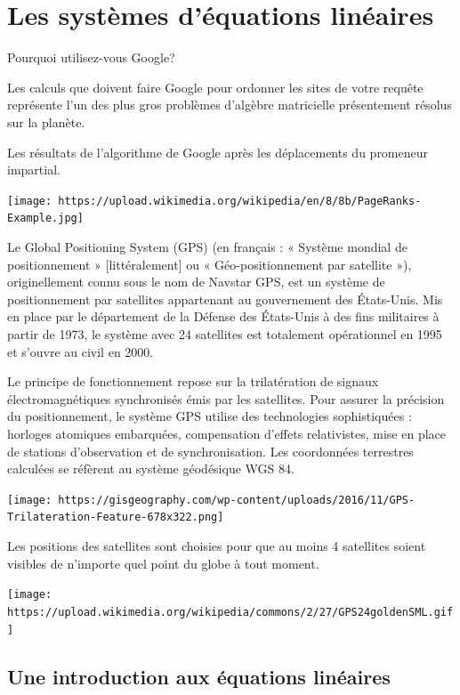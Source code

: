 \documentclass[]{book}
\theoremstyle{definition}
\theoremstyle{definition}
\theoremstyle{definition}
\theoremstyle{remark}
\let\BeginKnitrBlock\begin \let\EndKnitrBlock\end
\begin{document}
\hypertarget{sel}{%
\chapter{Les systèmes d'équations linéaires}\label{sel}}

\BeginKnitrBlock{example}
\protect\hypertarget{exm:unnamed-chunk-1}{}{\label{exm:unnamed-chunk-1} }Pourquoi utilisez-vous Google?

Les calculs que doivent faire Google pour ordonner les sites de votre requête représente l'un des plus gros problèmes d'algèbre matricielle présentement résolus sur la planète.

Les résultats de l'algorithme de Google après les déplacements du promeneur impartial.

\texttt{[image: https://upload.wikimedia.org/wikipedia/en/8/8b/PageRanks-Example.jpg]}
\EndKnitrBlock{example}

\BeginKnitrBlock{example}[Où suis-je?]
\protect\hypertarget{exm:unnamed-chunk-2}{}{\label{exm:unnamed-chunk-2} {} }Le Global Positioning System (GPS) (en français : « Système mondial de positionnement » {[}littéralement{]} ou « Géo-positionnement par satellite »), originellement connu sous le nom de Navstar GPS, est un système de positionnement par satellites appartenant au gouvernement des États-Unis. Mis en place par le département de la Défense des États-Unis à des fins militaires à partir de 1973, le système avec 24 satellites est totalement opérationnel en 1995 et s'ouvre au civil en 2000.

Le principe de fonctionnement repose sur la trilatération de signaux électromagnétiques synchronisés émis par les satellites. Pour assurer la précision du positionnement, le système GPS utilise des technologies sophistiquées : horloges atomiques embarquées, compensation d'effets relativistes, mise en place de stations d'observation et de synchronisation. Les coordonnées terrestres calculées se réfèrent au système géodésique WGS 84.

\texttt{[image: https://gisgeography.com/wp-content/uploads/2016/11/GPS-Trilateration-Feature-678x322.png]}

Les positions des satellites sont choisies pour que au moins 4 satellites soient visibles de n'importe quel point du globe à tout moment.

\texttt{[image: https://upload.wikimedia.org/wikipedia/commons/2/27/GPS24goldenSML.gif]}
\EndKnitrBlock{example}

\hypertarget{sec:intro_equation_lineaire}{%
\section{Une introduction aux équations linéaires}\label{sec:intro_equation_lineaire}}
\end{document}
